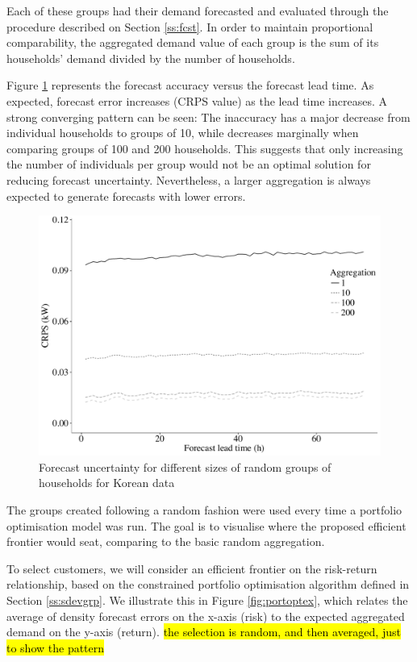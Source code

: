 \documentclass[review, 3p, 12pt, authoryear]{elsarticle}
\begin{document}
Each of these groups had their demand forecasted and evaluated through the procedure described on Section \ref{ss:fcst}.
In order to maintain proportional comparability, the aggregated demand value of each group is the sum of its households' demand divided by the number of households.

Figure \ref{fig:rndgrp} represents the forecast accuracy versus the forecast lead time.
As expected, forecast error increases (CRPS value) as the lead time increases.
A strong converging pattern can be seen:
The inaccuracy has a major decrease from individual households to groups of 10, while decreases marginally when comparing groups of 100 and 200 households.
This suggests that only increasing the number of individuals per group would not be an optimal solution for reducing forecast uncertainty.
Nevertheless, a larger aggregation is always expected to generate forecasts with lower errors.

\begin{figure}
  \centering
  \includegraphics[scale=0.5]{2017-10-13_rndgrp}
  \caption{Forecast uncertainty for different sizes of random groups of households for Korean data}
  \label{fig:rndgrp}
\end{figure}

The groups created following a random fashion were used every time a portfolio optimisation model was run.
The goal is to visualise where the proposed efficient frontier would seat, comparing to the basic random aggregation.

To select customers, we will consider an efficient frontier on the risk-return relationship, based on the constrained portfolio optimisation algorithm defined in Section \ref{ss:sdevgrp}. We illustrate this in Figure \ref{fig:portoptex}, which relates the average of density forecast errors on the x-axis (risk) to the expected aggregated demand on the y-axis (return). \hl{the selection is random, and then averaged, just to show the pattern}
\end{document}
